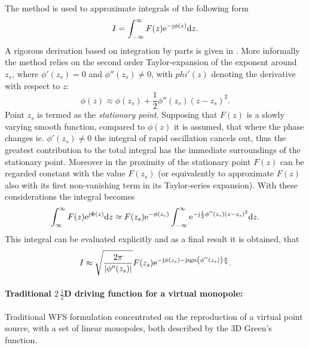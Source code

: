 The method is used to approximate integrals of the following form
\begin{equation}
I = \int_{-\infty}^{\infty} F(z) \mathrm{e}^{-\mathrm{j} \phi(z)} \mathrm{d} z.
\end{equation}
A rigorous derivation based on integration by parts is given in \cite{Bleistein1984, Bleistein1986}. More informally the method relies on the second order Taylor-expansion of the exponent around $z_s$, where $\phi'(z_s) = 0$ and $\phi''(z_s) \neq 0$, with $phi'(z)$ denoting the derivative with respect to $z$:
\begin{equation}
\phi(z) \approx \phi(z_s) + \frac{1}{2}\phi''(z_s)(z-z_s)^2.
\end{equation}
Point $z_s$ is termed as the \emph{stationary point}. Supposing that $F(z)$ is a slowly varying smooth function, compared to $\phi(z)$ it is assumed, that where the phase changes ie. $\phi'(z_s) \neq 0$ the integral of rapid oscillation cancels out, thus the greatest contribution to the total integral has the immediate surroundings of the stationary point. Moreover in the proximity of the stationary point $F(z)$ can be regarded constant with the value $F(z_s)$ (or equivalently to approximate $F(z)$ also with its first non-vanishing term in its Taylor-series expansion). With these considerations the integral becomes
\begin{equation}
\int_{\infty}^{\infty} F(z) \mathrm{e}^{\mathrm{j} \Phi(z)} \mathrm{d} z \approx
F(z_s)\mathrm{e}^{-\phi(z_s)} \int_{-\infty}^{\infty} \mathrm{e}^{-\mathrm{j} \frac{1}{2}\phi''(z_s)(z-z_s)^2} \mathrm{d} z.
\end{equation}
This integral can be evaluated explicitly and as a final result it is obtained, that
\begin{equation}
I \approx \sqrt{\frac{2\pi}{| \phi''(z_s) |}} F(z_s) \mathrm{e}^{-\mathrm{j} \phi(z_s) - \mathrm{j} \mathrm{sgn}\left(  \phi''(z_s) \right)\frac{\pi}{4}}. 
\end{equation}
	
\paragraph{Traditional $2\, \frac{1}{2}$D driving function for a virtual monopole:\\}
Traditional WFS formulation concentrated on the reproduction of a virtual point source, with a set of linear monopoles, both described by the 3D Green's function. 

